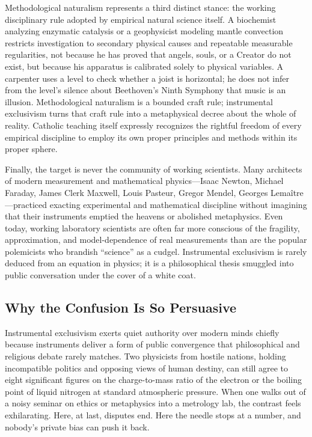Methodological naturalism represents a third distinct stance: the working disciplinary rule adopted by empirical natural science itself. A biochemist analyzing enzymatic catalysis or a geophysicist modeling mantle convection restricts investigation to secondary physical causes and repeatable measurable regularities, not because he has proved that angels, souls, or a Creator do not exist, but because his apparatus is calibrated solely to physical variables. A carpenter uses a level to check whether a joist is horizontal; he does not infer from the level's silence about Beethoven's Ninth Symphony that music is an illusion. Methodological naturalism is a bounded craft rule; instrumental exclusivism turns that craft rule into a metaphysical decree about the whole of reality. Catholic teaching itself expressly recognizes the rightful freedom of every empirical discipline to employ its own proper principles and methods within its proper sphere.

Finally, the target is never the community of working scientists. Many architects of modern measurement and mathematical physics---Isaac Newton, Michael Faraday, James Clerk Maxwell, Louis Pasteur, Gregor Mendel, Georges Lema\^itre---practiced exacting experimental and mathematical discipline without imagining that their instruments emptied the heavens or abolished metaphysics. Even today, working laboratory scientists are often far more conscious of the fragility, approximation, and model-dependence of real measurements than are the popular polemicists who brandish ``science'' as a cudgel. Instrumental exclusivism is rarely deduced from an equation in physics; it is a philosophical thesis smuggled into public conversation under the cover of a white coat.

\subsection{Why the Confusion Is So Persuasive}

Instrumental exclusivism exerts quiet authority over modern minds chiefly because instruments deliver a form of public convergence that philosophical and religious debate rarely matches. Two physicists from hostile nations, holding incompatible politics and opposing views of human destiny, can still agree to eight significant figures on the charge-to-mass ratio of the electron or the boiling point of liquid nitrogen at standard atmospheric pressure. When one walks out of a noisy seminar on ethics or metaphysics into a metrology lab, the contrast feels exhilarating. Here, at last, disputes end. Here the needle stops at a number, and nobody's private bias can push it back.

